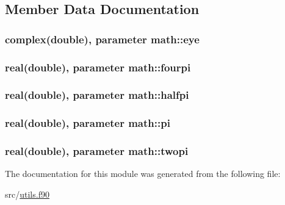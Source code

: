 \subsection{Member Data Documentation}
\hypertarget{classmath_ae0354610846d49064ea0336f19d5bf3f}{
\subsubsection[{eye}]{\setlength{\rightskip}{0pt plus 5cm}complex(double), parameter math\+::eye}}\label{classmath_ae0354610846d49064ea0336f19d5bf3f}
\hypertarget{classmath_a83cddb754967ada1a15217d10ed9c24b}{
\subsubsection[{fourpi}]{\setlength{\rightskip}{0pt plus 5cm}real(double), parameter math\+::fourpi}}\label{classmath_a83cddb754967ada1a15217d10ed9c24b}
\hypertarget{classmath_a99d72d3bce2cadc8630d10ee09aaa3ea}{
\subsubsection[{halfpi}]{\setlength{\rightskip}{0pt plus 5cm}real(double), parameter math\+::halfpi}}\label{classmath_a99d72d3bce2cadc8630d10ee09aaa3ea}
\hypertarget{classmath_aa2f838077707f6cdb0c8a0ec69719690}{
\subsubsection[{pi}]{\setlength{\rightskip}{0pt plus 5cm}real(double), parameter math\+::pi}}\label{classmath_aa2f838077707f6cdb0c8a0ec69719690}
\hypertarget{classmath_aeb6d7ed6a20444e26f024b34eaa4c4f7}{
\subsubsection[{twopi}]{\setlength{\rightskip}{0pt plus 5cm}real(double), parameter math\+::twopi}}\label{classmath_aeb6d7ed6a20444e26f024b34eaa4c4f7}


The documentation for this module was generated from the following file\+:\begin{DoxyCompactItemize}
\item 
src/\hyperlink{utils_8f90}{utils.\+f90}\end{DoxyCompactItemize}
